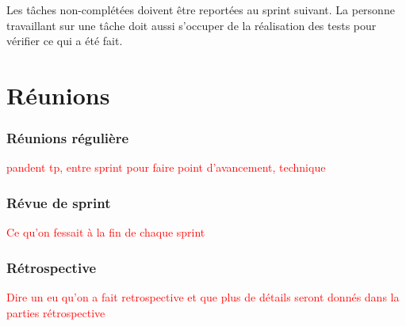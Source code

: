 \documentclass[a4paper,12pt]{article}
\begin{document}
Les tâches non-complétées doivent être reportées au sprint suivant. La personne travaillant sur une tâche doit aussi s'occuper de la réalisation des tests pour vérifier ce qui a été fait.
\section{Réunions}
\subsubsection{Réunions régulière}
\textcolor{red}{pandent tp, entre sprint pour faire point d'avancement, technique}


\subsubsection{Révue de sprint}
\textcolor{red}{Ce qu'on fessait à la fin de chaque sprint}

\subsubsection{Rétrospective}
\textcolor{red}{Dire un eu qu'on a fait retrospective et que plus de détails seront donnés dans la parties rétrospective}
\end{document}
